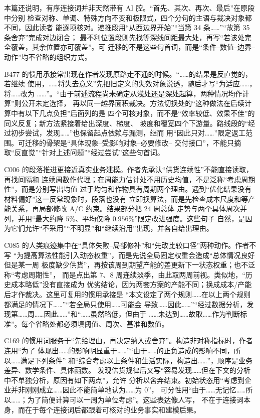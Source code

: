 本篇还说明，有序连接词并非天然带有 AI 腔。“首先、其次、再次、最后”在原段中分别
检查对称、单调、特殊方向不变和极限式，四个分句的主语与裁决对象都不同，因此读者
能逐项核对。递推段用“从西边界开始”“当第 34 条……”“故第 35 条舍弃”完成对边闭合；
最不利位置段则先找等深线间距最大处，再写“若该处完全覆盖，其余位置亦可覆盖”。可
迁移的不是这些句首词，而是“条件--数值--边界--动作”均不省略的组织方式。

B477 的惯用承接常出现在作者发现原路走不通的时候。“……的结果是反直觉的，若继续
使用，……将失去意义”先把旧定义的失效对象说透，随后才写“为适应……，将……改为
……”。“由于前述流程尚未确定从浅处还是深处起算，两种情况均作计算”则公开未定选择，
再以同一越界面积裁决。方法切换处的“这种做法在后续计算中有以下几点负担”后面列的是
四个可核对象，而不是“效率较低、效果不佳”的同义反复；新方法紧接着给出深度、梯度、
坡度和覆宽四个下游量。路线段的“经过初步尝试，发现……”也保留起点依赖与漏测，继而
用“因此只对……”限定返工范围。可迁移的骨架是“具体现象--受影响对象--必要修改--
交付接口”，不能只摘取“反直觉”“针对上述问题”“经过尝试”这些句首词。

C006 的段落推进更接近真实业务建模。作者先承认“供货连续性”不能直接读取，再找间隔和
连续周数作代理；在周能力估计处不用历史均值，不是泛称“考虑周期性”，而是分别写出均值
过于均匀和作物具有周期两个理由。遇到“优化结果没有材料偏好”这一反常现象时，段落也没有
立即换算法，而是先检查成本尺度和等产能关系，再局部修改 A/C 约束。结果部分把 24 周总体
走势与两个具体周次并列，并用“最大约降 $5\%$、平均仅降 $0.956\%$”限定改进强度。这些句子
自然，是因为它们允许“不采用”“不明显”和“继续沿用”出现，并各自给出理由。

C085 的人类痕迹集中在“具体失败--局部修补”和“先改比较口径”两种动作。作者不写
“为提高算法性能引入动态权重”，而是先说全局固定权重会造成“总体情况良好但是某一周
极度缺少供货”，再按该周到期望产能的差更新下一状态权重；也不泛称“考虑周期性”，
而是点出第 7、8 周连续淡季，由此取两周前视。类似地，“历史成本略低”没有直接成为
优劣结论，因为两套方案的产能不同；换成成本/产能后才作裁决。这里可复用的惯用承接是
“本文设定了两个规则……在以上两个规则都满足的情况下……”“若全局只使用……可能会
导致……因此……”“经过数据分析，发现第……周……因此……”和“……虽然略低，但由于
……未达到……故取……作为判断标准”。每个省略处都必须填阈值、周次、基准和数值。

C169 的惯用词服务于“先给理由，再决定纳入或舍弃”。构造非对称指标时，作者连用“为了
体现出……的影响明显重于……”“由于……的正负造成的影响不同，所以……满足下列条件”
和“综合考虑以上条件和生活实际，构造出……”，顺序是业务差异、数学条件、具体函数。
发现供货规律后又写“容易发现……但在下文的分析中不单独分析，原因有如下两点”，允许
分析以舍弃结束。初始状态用“考虑到企业并非刚刚成立……因此不能简单地认为……为 0”，
可分性用“由于……无记忆……所以……；为了简便计算可以一周为单位考虑”。这些表达像人写，
不在于连接词本身，而在于每个连接词后都跟着可核对的业务事实和建模后果。

